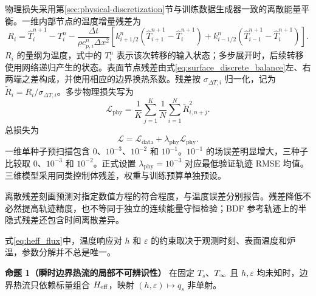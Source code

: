 物理损失采用第\ref{sec:physical-discretization}节与训练数据生成器一致的离散能量平衡。一维内部节点的温度增量残差为
\begin{equation}
  R_i=\widehat{T}_i^{n+1}-T_i^n
  -\frac{\Delta t}{\rho c_{p,i}^{n}\Delta x^2}\left[
  k_{i+1/2}^{n}(\widehat{T}_{i+1}^{n+1}-\widehat{T}_{i}^{n+1})
  +k_{i-1/2}^{n}(\widehat{T}_{i-1}^{n+1}-\widehat{T}_{i}^{n+1})
  \right].
  \label{eq:temperature_residual}
\end{equation}
$R_i$ 的量纲为温度，式中的 $T_i^n$ 表示该次转移的输入状态；多步展开时，后续转移使用网络递归产生的状态。表面节点残差由式\eqref{eq:surface_discrete_balance}左、右两端之差构成，并使用相应的边界换热系数。残差按 $\sigma_{\Delta T,i}$ 归一化，记为 $\widetilde{R}_i=R_i/\sigma_{\Delta T,i}$。多步物理损失写为
\begin{equation}
  \mathcal{L}_{\mathrm{phy}}
  =\frac{1}{K}\sum_{j=1}^{K}
  \frac{1}{N}\sum_{i=1}^{N}\widetilde{R}_{i,n+j}^{2}.
\end{equation}
总损失为
\begin{equation}
  \mathcal{L}=\mathcal{L}_{\mathrm{data}}+\lambda_{\mathrm{phy}}\mathcal{L}_{\mathrm{phy}}.
  \label{eq:total_loss}
\end{equation}
一维单种子预扫描包含 $0$、$10^{-3}$、$10^{-2}$ 和 $10^{-1}$。$10^{-1}$ 的场误差明显增大，三种子比较取 $0$、$10^{-3}$ 和 $10^{-2}$。正式设置 $\lambda_{\mathrm{phy}}=10^{-3}$ 对应最低验证轨迹 RMSE 均值。三维模型采用同类控制体残差，权重与训练预算单独预设。

离散残差刻画预测对指定数值方程的符合程度，与温度误差分别报告。残差降低不必然提高轨迹精度，也不等同于独立的连续能量守恒检验；BDF 参考轨迹上的半隐式残差还包含时间离散差异。

\label{sec:boundary-identifiability}

式\eqref{eq:heff_flux}中，温度响应对 $h$ 和 $\varepsilon$ 的约束取决于观测时刻、表面温度和炉温，参数分解并不总是唯一。

\noindent\textbf{命题 1（瞬时边界热流的局部不可辨识性）}
在固定 $T_s$、${T_{\infty}}$ 且 $h,\varepsilon$ 均未知时，边界热流只依赖标量组合 ${H_{\mathrm{eff}}}$，映射 $(h,\varepsilon)\mapsto q_s$ 非单射。


